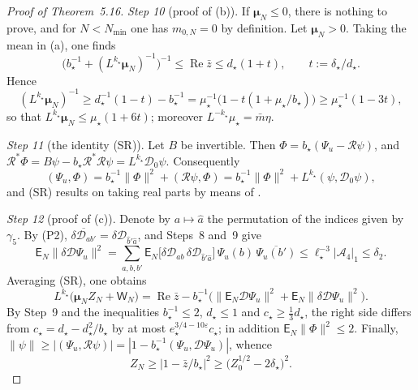 \documentclass[11pt]{amsart}
\theoremstyle{definition}
\begin{document}
\begin{proof}[Proof of Theorem~5.16]
\emph{Step 10} (proof of (b)).
If $\boldsymbol\mu_N\le0$, there is nothing to prove, and for $N<N_{\min}$ one has $m_{0,N}=0$ by definition.
Let $\boldsymbol\mu_N>0$.
Taking the mean in (a), one finds
\begin{equation*}
\bigl(b_\star^{-1}+(L^{k_\star}\boldsymbol\mu_N)^{-1}\bigr)^{-1}\le\operatorname{Re}\bar z\le d_\star(1+t),\qquad t:=\delta_\star/d_\star .
\end{equation*}
Hence
\begin{equation*}
(L^{k_\star}\boldsymbol\mu_N)^{-1}\ge d_\star^{-1}(1-t)-b_\star^{-1}=\mu_\star^{-1}\bigl(1-t(1+\mu_\star/b_\star)\bigr)\ge\mu_\star^{-1}(1-3t),
\end{equation*}
so that $L^{k_\star}\boldsymbol\mu_N\le\mu_\star(1+6t)$;
moreover $L^{-k_\star}\mu_\star=\bar m\eta$.

\emph{Step 11} (the identity (SR)).
Let $B$ be invertible.
Then $\Phi=b_\star(\Psi_u-\mathcal R\psi)$, and $\mathcal R^*\Phi=\allowbreak B\psi-b_\star\mathcal R^*\mathcal R\psi=\allowbreak L^{k_\star}\mathcal D_0\psi$.
Consequently
\begin{equation*}
(\Psi_u,\Phi)=b_\star^{-1}\|\Phi\|^2+(\mathcal R\psi,\Phi)=b_\star^{-1}\|\Phi\|^2+L^{k_\star}(\psi,\mathcal D_0\psi),
\end{equation*}
and (SR) results on taking real parts by means of \cite[(I.O2)]{QEDIII}.

\emph{Step 12} (proof of (c)).
Denote by $a\mapsto\hat a$ the permutation of the indices given by $\gamma_5$.
By (P2), $\overline{\delta\mathcal D_{ab'}}=\allowbreak \delta\mathcal D_{\hat b'\hat a}$, and Steps~8 and~9 give
\begin{equation*}
\mathsf E_N\|\delta\mathcal D\Psi_u\|^2=\sum_{a,b,b'}\mathsf E_N\bigl[\delta\mathcal D_{ab}\,\delta\mathcal D_{\hat b'\hat a}\bigr]\,\Psi_u(b)\,\overline{\Psi_u(b')}\le\ell_\star^{-3}|\mathcal A_4|_1\le\delta_2 .
\end{equation*}
Averaging (SR), one obtains
\begin{equation*}
L^{k_\star}\bigl(\boldsymbol\mu_NZ_N+\mathsf W_N\bigr)=\operatorname{Re}\bar z-b_\star^{-1}\bigl(\|\mathsf E_N\mathcal D\Psi_u\|^2+\mathsf E_N\|\delta\mathcal D\Psi_u\|^2\bigr).
\end{equation*}
By Step~9 and the inequalities $b_\star^{-1}\le2$, $d_\star\le1$ and $c_\star\ge\frac13d_\star$, the right side differs from $c_\star=d_\star-d_\star^2/b_\star$ by at most $e_\star^{3/4-10\varepsilon}c_\star$;
in addition $\mathsf E_N\|\Phi\|^2\le2$.
Finally, $\|\psi\|\ge|(\Psi_u,\allowbreak \mathcal R\psi)|=\allowbreak |1-b_\star^{-1}(\Psi_u,\allowbreak \mathcal D\Psi_u)|$, whence
\begin{equation*}
Z_N\ge|1-\bar z/b_\star|^2\ge\bigl(Z_0^{1/2}-2\delta_\star\bigr)^2 .
\end{equation*}


\end{proof}
\end{document}
